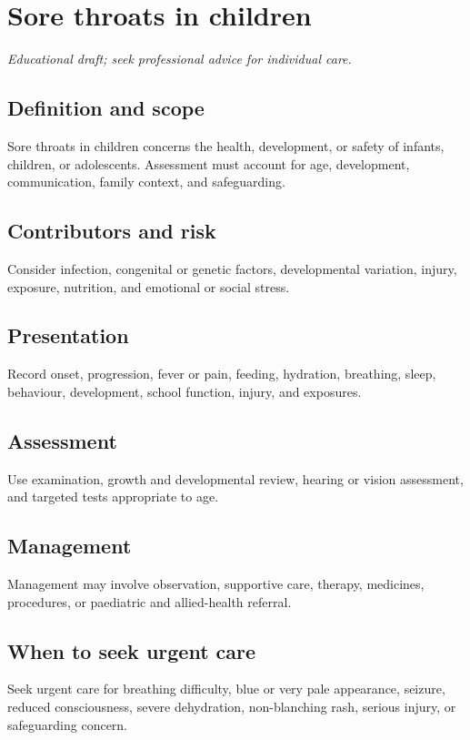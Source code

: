 \chapter{Sore throats in children}
\medskip
\noindent\textit{Educational draft; seek professional advice for individual care.}

\section*{Definition and scope}
Sore throats in children concerns the health, development, or safety of infants, children, or adolescents. Assessment must account for age, development, communication, family context, and safeguarding.

\section*{Contributors and risk}
Consider infection, congenital or genetic factors, developmental variation, injury, exposure, nutrition, and emotional or social stress.

\section*{Presentation}
Record onset, progression, fever or pain, feeding, hydration, breathing, sleep, behaviour, development, school function, injury, and exposures.

\section*{Assessment}
Use examination, growth and developmental review, hearing or vision assessment, and targeted tests appropriate to age.

\section*{Management}
Management may involve observation, supportive care, therapy, medicines, procedures, or paediatric and allied-health referral.

\section*{When to seek urgent care}
Seek urgent care for breathing difficulty, blue or very pale appearance, seizure, reduced consciousness, severe dehydration, non-blanching rash, serious injury, or safeguarding concern.

